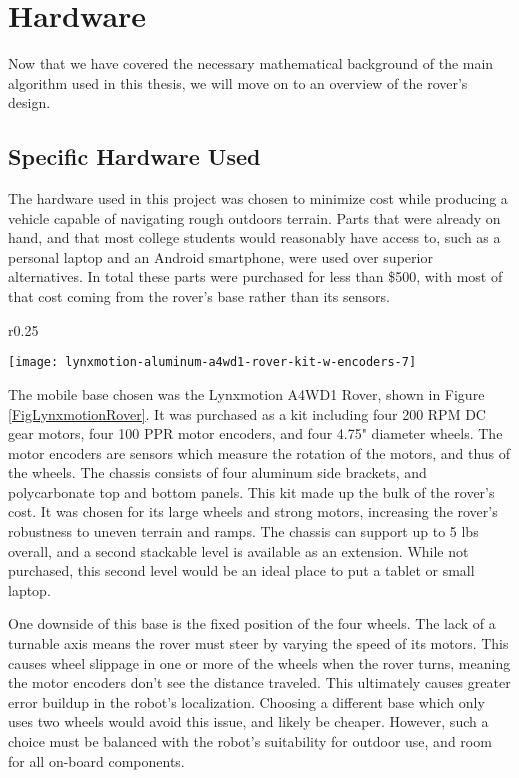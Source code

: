 \chapter{Hardware}

Now that we have covered the necessary mathematical background of the main algorithm used in this thesis, we will move on to an overview of the rover's design. 
\section{Specific Hardware Used} \label{sectionSpecificHardware}
The hardware used in this project was chosen to minimize cost while producing a vehicle capable of navigating rough outdoors terrain. Parts that were already on hand, and that most college students would reasonably have access to, such as a personal laptop and an Android smartphone, were used over superior alternatives. In total these parts were purchased for less than \$500, with most of that cost coming from the rover's base rather than its sensors.

\begin{wrapfigure}{r}{0.25\textwidth} %
	\caption{\cite{fig_lynxmotion_rover}}
	\centering
	\texttt{[image: lynxmotion-aluminum-a4wd1-rover-kit-w-encoders-7]}
	\label{FigLynxmotionRover}
\end{wrapfigure}

The mobile base chosen was the Lynxmotion A4WD1 Rover, shown in Figure \ref{FigLynxmotionRover}. It was purchased as a kit including four 200 RPM DC gear motors, four 100 PPR motor encoders, and four 4.75" diameter wheels. The motor encoders are sensors which measure the rotation of the motors, and thus of the wheels. The chassis consists of four aluminum side brackets, and polycarbonate top and bottom panels. This kit made up the bulk of the rover's cost. It was chosen for its large wheels and strong motors, increasing the rover's robustness to uneven terrain and ramps. The chassis can support up to 5 lbs overall, and a second stackable level is available as an extension. While not purchased, this second level would be an ideal place to put a tablet or small laptop.

One downside of this base is the fixed position of the four wheels. The lack of a turnable axis means the rover must steer by varying the speed of its motors. This causes wheel slippage in one or more of the wheels when the rover turns, meaning the motor encoders don't see the distance traveled. This ultimately causes greater error buildup in the robot's localization. Choosing a different base which only uses two wheels would avoid this issue, and likely be cheaper. However, such a choice must be balanced with the robot's suitability for outdoor use, and room for all on-board components.

